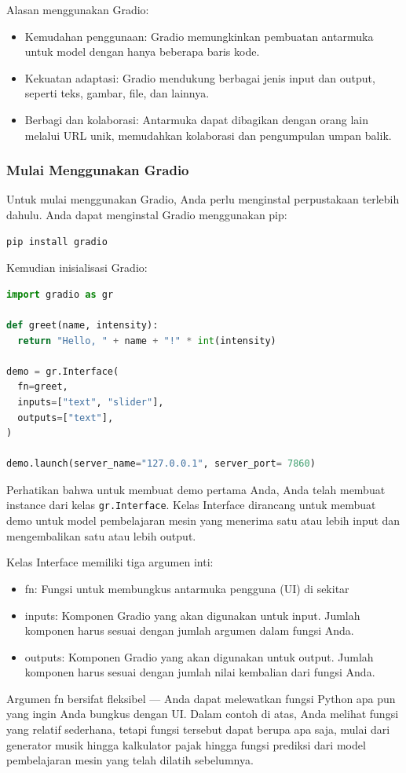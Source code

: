 \documentclass{article}
\begin{document}
Alasan menggunakan Gradio:
\begin{itemize}
    \item Kemudahan penggunaan: Gradio memungkinkan pembuatan antarmuka untuk model dengan hanya beberapa baris kode.
    \item Kekuatan adaptasi: Gradio mendukung berbagai jenis input dan output, seperti teks, gambar, file, dan lainnya.
    \item Berbagi dan kolaborasi: Antarmuka dapat dibagikan dengan orang lain melalui URL unik, memudahkan kolaborasi dan pengumpulan umpan balik.
\end{itemize}

\subsubsection{Mulai Menggunakan Gradio}
Untuk mulai menggunakan Gradio, Anda perlu menginstal perpustakaan terlebih dahulu. Anda dapat menginstal Gradio menggunakan pip:
\begin{lstlisting}[language=Python, caption={}, captionpos=b]
pip install gradio
\end{lstlisting}

Kemudian inisialisasi Gradio:
\begin{lstlisting}[language=Python, caption={}, captionpos=b]
import gradio as gr

def greet(name, intensity):
  return "Hello, " + name + "!" * int(intensity)

demo = gr.Interface(
  fn=greet,
  inputs=["text", "slider"],
  outputs=["text"],
)

demo.launch(server_name="127.0.0.1", server_port= 7860)
\end{lstlisting}

Perhatikan bahwa untuk membuat demo pertama Anda, Anda telah membuat instance dari kelas \verb|gr.Interface|. Kelas Interface dirancang untuk membuat demo untuk model pembelajaran mesin yang menerima satu atau lebih input dan mengembalikan satu atau lebih output.

Kelas Interface memiliki tiga argumen inti:
\begin{itemize}
    \item fn: Fungsi untuk membungkus antarmuka pengguna (UI) di sekitar
    \item inputs: Komponen Gradio yang akan digunakan untuk input. Jumlah komponen harus sesuai dengan jumlah argumen dalam fungsi Anda.
    \item outputs: Komponen Gradio yang akan digunakan untuk output. Jumlah komponen harus sesuai dengan jumlah nilai kembalian dari fungsi Anda.
\end{itemize}
Argumen fn bersifat fleksibel — Anda dapat melewatkan fungsi Python apa pun yang ingin Anda bungkus dengan UI. Dalam contoh di atas, Anda melihat fungsi yang relatif sederhana, tetapi fungsi tersebut dapat berupa apa saja, mulai dari generator musik hingga kalkulator pajak hingga fungsi prediksi dari model pembelajaran mesin yang telah dilatih sebelumnya.
\end{document}
